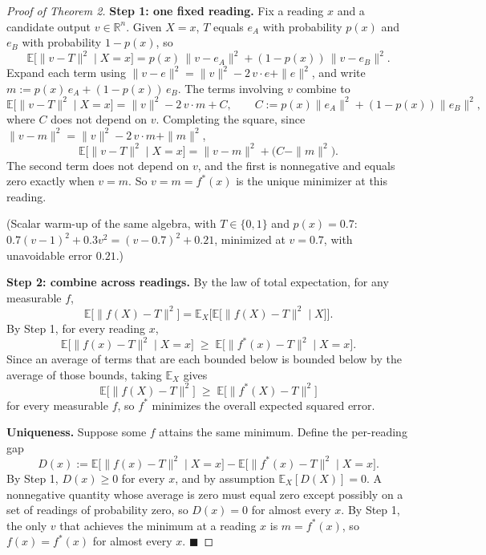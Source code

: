 \documentclass[11pt]{article}
\begin{document}
\begin{proof}[Proof of Theorem 2]
\textbf{Step 1: one fixed reading.} Fix a reading $x$ and a candidate output
$v\in\mathbb{R}^n$. Given $X=x$, $T$ equals $e_A$ with probability $p(x)$ and
$e_B$ with probability $1-p(x)$, so
\[
  \mathbb{E}\big[\|v-T\|^2 \mid X=x\big]
  = p(x)\,\|v-e_A\|^2 + (1-p(x))\,\|v-e_B\|^2.
\]
Expand each term using $\|v-e\|^2 = \|v\|^2 - 2\,v\cdot e + \|e\|^2$, and
write $m := p(x)\,e_A + (1-p(x))\,e_B$. The terms involving $v$ combine to
\[
  \mathbb{E}\big[\|v-T\|^2 \mid X=x\big] = \|v\|^2 - 2\,v\cdot m + C,
  \qquad C := p(x)\|e_A\|^2 + (1-p(x))\|e_B\|^2,
\]
where $C$ does not depend on $v$. Completing the square, since
$\|v-m\|^2 = \|v\|^2 - 2\,v\cdot m + \|m\|^2$,
\[
  \mathbb{E}\big[\|v-T\|^2 \mid X=x\big] = \|v-m\|^2 + \big(C - \|m\|^2\big).
\]
The second term does not depend on $v$, and the first is nonnegative and
equals zero exactly when $v=m$. So $v=m=f^\ast(x)$ is the unique minimizer at
this reading.

(Scalar warm-up of the same algebra, with $T\in\{0,1\}$ and $p(x)=0.7$:
$0.7(v-1)^2 + 0.3v^2 = (v-0.7)^2 + 0.21$, minimized at $v=0.7$, with
unavoidable error $0.21$.)

\textbf{Step 2: combine across readings.} By the law of total expectation,
for any measurable $f$,
\[
  \mathbb{E}\big[\|f(X)-T\|^2\big]
  = \mathbb{E}_X\Big[\mathbb{E}\big[\|f(X)-T\|^2 \mid X\big]\Big].
\]
By Step 1, for every reading $x$,
\[
  \mathbb{E}\big[\|f(x)-T\|^2 \mid X=x\big] \;\ge\;
  \mathbb{E}\big[\|f^\ast(x)-T\|^2 \mid X=x\big].
\]
Since an average of terms that are each bounded below is bounded below by
the average of those bounds, taking $\mathbb{E}_X$ gives
\[
  \mathbb{E}\big[\|f(X)-T\|^2\big] \;\ge\; \mathbb{E}\big[\|f^\ast(X)-T\|^2\big]
\]
for every measurable $f$, so $f^\ast$ minimizes the overall expected squared
error.

\textbf{Uniqueness.} Suppose some $f$ attains the same minimum. Define the
per-reading gap
\[
  D(x) := \mathbb{E}\big[\|f(x)-T\|^2 \mid X=x\big]
        - \mathbb{E}\big[\|f^\ast(x)-T\|^2 \mid X=x\big].
\]
By Step 1, $D(x)\ge 0$ for every $x$, and by assumption $\mathbb{E}_X[D(X)]=0$.
A nonnegative quantity whose average is zero must equal zero except possibly
on a set of readings of probability zero, so $D(x)=0$ for almost every $x$.
By Step 1, the only $v$ that achieves the minimum at a reading $x$ is
$m=f^\ast(x)$, so $f(x)=f^\ast(x)$ for almost every $x$. $\blacksquare$
\end{proof}
\end{document}
